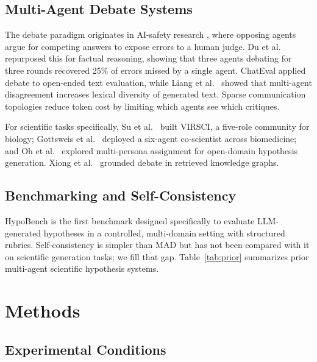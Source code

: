\subsection{Multi-Agent Debate Systems}

The debate paradigm originates in AI-safety research \cite{Irving2018}, where
opposing agents argue for competing answers to expose errors to a human judge.
Du et al.\ \cite{Du2024} repurposed this for factual reasoning, showing that
three agents debating for three rounds recovered 25\% of errors missed by a
single agent.  ChatEval \cite{Chan2023} applied debate to open-ended text
evaluation, while Liang et al.\ \cite{Liang2024} showed that multi-agent
disagreement increases lexical diversity of generated text.  Sparse communication
topologies \cite{Li2024sparse} reduce token cost by limiting which agents see
which critiques.

For scientific tasks specifically, Su et al.\ \cite{Su2025} built VIRSCI, a
five-role community for biology; Gottsweis et al.\ \cite{Gottsweis2026} deployed
a six-agent co-scientist across biomedicine; and Oh et al.\ \cite{Oh2026}
explored multi-persona assignment for open-domain hypothesis generation.
Xiong et al.\ \cite{Xiong2024} grounded debate in retrieved knowledge graphs.

\subsection{Benchmarking and Self-Consistency}

HypoBench \cite{Liu2025} is the first benchmark designed specifically to evaluate
LLM-generated hypotheses in a controlled, multi-domain setting with structured
rubrics.  Self-consistency \cite{Wang2022} is simpler than MAD but has not been
compared with it on scientific generation tasks; we fill that gap.
Table~\ref{tab:prior} summarizes prior multi-agent scientific hypothesis systems.



\section{Methods}
\label{sec:methods}

\subsection{Experimental Conditions}

